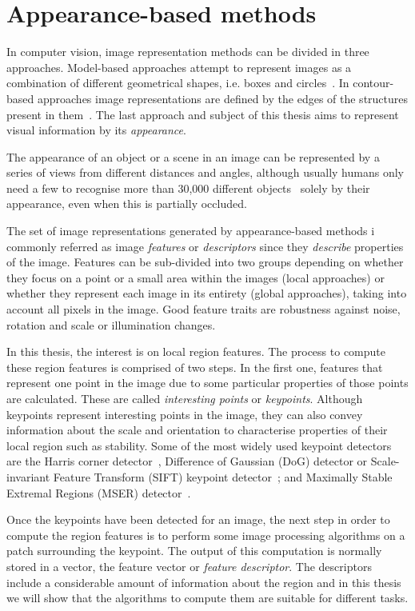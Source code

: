 \section{Appearance-based methods}

In computer vision, image representation methods can be divided in three approaches. Model-based approaches attempt to represent images as a combination of different geometrical shapes, i.e. boxes and circles~\cite{biederman1987}. In contour-based approaches image representations are defined by the edges of the structures present in them~\cite{canny1986computational}. The last approach and subject of this thesis aims to represent visual information by its \textit{appearance}. 

The appearance of an object or a scene in an image can be represented by a series of views from different distances and angles, although usually humans only need a few to recognise more than 30,000 different objects~\cite{biederman1987recognition} solely by their appearance, even when this is partially occluded. 

The set of image representations generated by appearance-based methods i commonly referred as image \textit{features} or \textit{descriptors} since they \textit{describe} properties of the image. Features can be sub-divided into two groups depending on whether they focus on a point or a small area within the images (local approaches) or whether they represent each image in its entirety (global approaches), taking into account all pixels in the image. Good feature traits are robustness against noise, rotation and scale or illumination changes. 

In this thesis, the interest is on local region features. The process to compute these region features is comprised of two steps. In the first one, features that represent one point in the image due to some particular properties of those points are calculated. These are called \textit{interesting points} or \textit{keypoints}. Although keypoints represent interesting points in the image, they can also convey information about the scale and orientation to characterise properties of their local region such as stability. Some of the most widely used keypoint detectors are the Harris corner detector~\cite{harris1988combined}, Difference of Gaussian (DoG) detector or Scale-invariant Feature Transform (SIFT) keypoint detector~\cite{lowe2004}; and Maximally Stable Extremal Regions (MSER) detector~\cite{matas2004robust}.

Once the keypoints have been detected for an image, the next step in order to compute the region features is to perform some image processing algorithms on a patch surrounding the keypoint. The output of this computation is normally stored in a vector, the feature vector or \textit{feature descriptor}. The descriptors include a considerable amount of information about the region and in this thesis we will show that the algorithms to compute them 	are suitable for different tasks.

